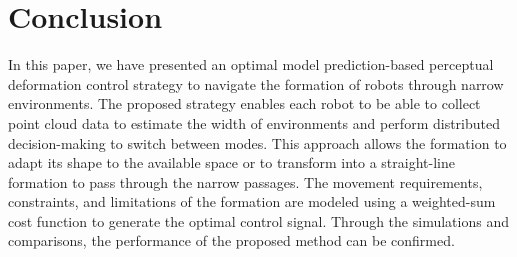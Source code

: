 \section{Conclusion}\label{sec:conclusion}

In this paper, we have presented an optimal model prediction-based perceptual deformation control strategy to navigate the formation of robots through narrow environments. The proposed strategy enables each robot to be able to collect point cloud data to estimate the width of environments and perform distributed decision-making to switch between modes. This approach allows the formation to adapt its shape to the available space or to transform into a straight-line formation to pass through the narrow passages. The movement requirements, constraints, and limitations of the formation are modeled using a weighted-sum cost function to generate the optimal control signal. Through the simulations and comparisons, the performance of the proposed method can be confirmed.